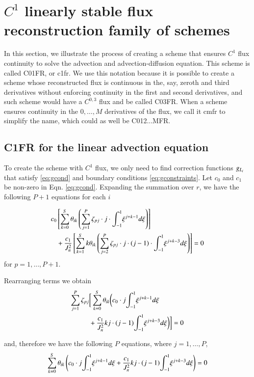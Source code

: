 \section{$C^{1}$ linearly stable flux reconstruction family of schemes}
In this section, we illustrate the process of creating a scheme that ensures $C^{1}$
flux continuity to solve the advection and advection-diffusion equation. This scheme is called C01FR, or \gls{c1fr}. We use this notation because it is possible to create a scheme whose reconstructed flux is continuous in the, say, zeroth and third derivatives without enforcing continuity in the first and second derivatives, and such scheme would have a $C^{0,3}$ flux and be called C03FR. When a scheme ensures continuity in the $0,\dots,M$ derivatives of the flux, we call it \gls{cmfr} to simplify the name, which could as well be C012...MFR.

\subsection{C1FR for the linear advection equation}
To create the scheme with $C^{1}$ flux, we only need to find correction functions ${g_{L_i}}$ that satisfy \eqref{eq:gcond} and boundary conditions \eqref{eq:gconstraints}.
Let $c_0$ and $c_1$ be non-zero in Eqn. \eqref{eq:gcond}. Expanding the summation over $r$, we have the following $P+1$ equations for each $i$

\begin{equation}
\begin{split}
c_0 &\left[ \sum^S_{k=0} \theta_{ik}\left( \sum^P_{j=1}\zeta_{pj}\cdot j\cdot {\int^1_{-1}}  \xi^{j+k-1}d\xi \right) \right] \\
&+ 
\frac{c_1}{J^2_n} \left[ \sum^S_{k=1} k \theta_{ik} \left( \sum^P_{j=2}\zeta_{pj}\cdot j\cdot (j-1)\cdot {\int^1_{-1}}  \xi^{j+k-3}d\xi \right) \right]
 = 0
 \end{split}
\end{equation}
for $p = 1,...,P+1$.

Rearranging terms we obtain
\begin{equation}
\begin{split}
\sum^P_{j=1} \zeta_{pj} &\bigg[ \sum^S_{k=0} \theta_{ik}\bigg( c_0\cdot  j {\int^1_{-1}}  \xi^{j+k-1}d\xi  \\
&+ \frac{c_1}{J^2_n} k j\cdot (j-1)  {\int^1_{-1}}  \xi^{j+k-3}d\xi \bigg) \bigg]
 = 0
 \end{split}
\end{equation}

and, therefore we have the following $P$ equations, where $j = 1,\dots,P$,
\begin{equation}
\label{eqn:system}
\sum^S_{k=0} \theta_{ik}\left( c_0\cdot  j {\int^1_{-1}}  \xi^{j+k-1}d\xi  + \frac{c_1}{J^2_n} k j\cdot (j-1)  {\int^1_{-1}}  \xi^{j+k-3}d\xi \right) = 0
\end{equation}


